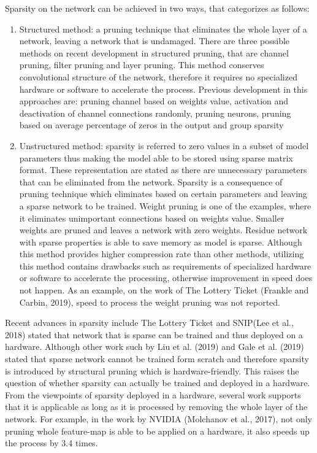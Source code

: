     Sparsity on the network can be achieved in two ways, that categorizes as follows:
    \begin{enumerate}
    	\item Structured method: a pruning technique that eliminates the whole layer of a network, leaving a network that is undamaged. There are three possible methods on recent development in structured pruning, that are channel pruning, filter pruning and layer pruning. This method conserves convolutional structure of the network, therefore it requires no specialized hardware or software to accelerate the process. Previous development in this approaches are: pruning channel based on weights value, activation and deactivation of channel connections randomly, pruning neurons, pruning based on average percentage of zeros in the output and group sparsity
    	\item Unstructured method: sparsity is referred to zero values in a subset of model parameters thus making the model able to be stored using sparse matrix format. These representation are stated as there are unnecessary parameters that can be eliminated from the network. Sparsity is a consequence of pruning technique which eliminates based on certain parameters and leaving a sparse network to be trained. Weight pruning is one of the examples, where it eliminates unimportant connections based on weights value. Smaller weights are pruned and leaves a network with zero weights. Residue network with sparse properties is able to save memory as model is sparse. Although this method provides higher compression rate than other methods, utilizing this method contains drawbacks such as requirements of specialized hardware or software to accelerate the processing, otherwise improvement in speed does not happen. As an example, on the work of The Lottery Ticket (Frankle and Carbin, 2019), speed to process the weight pruning was not reported.
    \end{enumerate}
    
    Recent advances in sparsity include The Lottery Ticket and SNIP(Lee et al., 2018) stated that network that is sparse can be trained and thus deployed on a hardware. Although other work such by Liu et al. (2019) and Gale et al. (2019) stated that sparse network cannot be trained form scratch and therefore sparsity is introduced by structural pruning which is hardware-friendly. This raises the question of whether sparsity can actually be trained and deployed in a hardware. From the viewpoints of sparsity deployed in a hardware, several work supports that it is applicable as long as it is processed by removing the whole layer of the network. For example, in the work by NVIDIA (Molchanov et al., 2017), not only pruning whole feature-map is able to be applied on a hardware, it also speeds up the process by 3.4 times.
    
